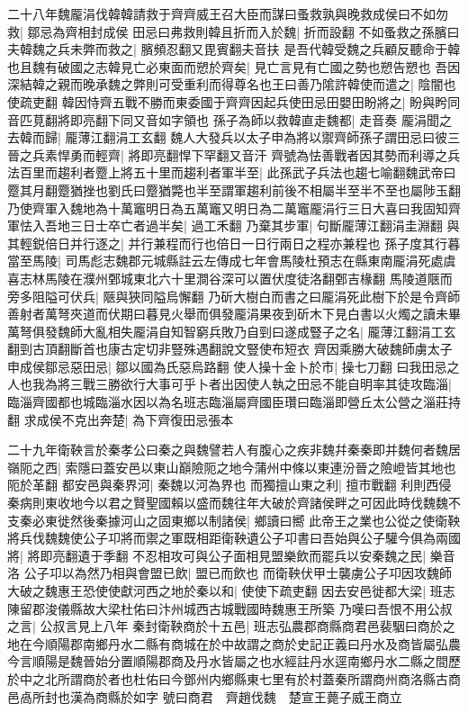 二十八年魏龎涓伐韓韓請救于齊齊威王召大臣而謀曰蚤救孰與晚救成侯曰不如勿救|{
	鄒忌為齊相封成侯}
田忌曰弗救則韓且折而入於魏|{
	折而設翻}
不如蚤救之孫臏曰夫韓魏之兵未弊而救之|{
	臏頻忍翻又毘賓翻夫音扶}
是吾代韓受魏之兵顧反聽命于韓也且魏有破國之志韓見亡必東面而愬於齊矣|{
	見亡言見有亡國之勢也愬告愬也}
吾因深結韓之親而晚承魏之弊則可受重利而得尊名也王曰善乃隂許韓使而遣之|{
	陰闇也使疏吏翻}
韓因恃齊五戰不勝而東委國于齊齊因起兵使田忌田嬰田盼將之|{
	盼與盻同音匹莧翻將即亮翻下同又音如字領也}
孫子為師以救韓直走魏都|{
	走音奏}
龎涓聞之去韓而歸|{
	龎薄江翻涓工玄翻}
魏人大發兵以太子申為將以禦齊師孫子謂田忌曰彼三晉之兵素悍勇而輕齊|{
	將即亮翻悍下罕翻又音汗}
齊號為怯善戰者因其勢而利導之兵法百里而趨利者蹷上將五十里而趨利者軍半至|{
	此孫武子兵法也趨七喻翻魏武帝曰蹷其月翻蹷猶挫也劉氏曰蹷猶斃也半至謂軍趨利前後不相屬半至半不至也屬陟玉翻}
乃使齊軍入魏地為十萬竈明日為五萬竈又明日為二萬竈龎涓行三日大喜曰我固知齊軍怯入吾地三日士卒亡者過半矣|{
	過工禾翻}
乃棄其步軍|{
	句斷龎薄江翻涓圭淵翻}
與其輕鋭倍日并行逐之|{
	并行兼程而行也倍日一日行兩日之程亦兼程也}
孫子度其行暮當至馬陵|{
	司馬彪志魏郡元城縣註云左傳成七年會馬陵杜預志在縣東南龎涓死處虞喜志林馬陵在濮州鄄城東北六十里澗谷深可以置伏度徒洛翻鄄吉椽翻}
馬陵道陿而旁多阻隘可伏兵|{
	陿與狹同隘烏懈翻}
乃斫大樹白而書之曰龎涓死此樹下於是令齊師善射者萬弩夾道而伏期曰暮見火舉而俱發龎涓果夜到斫木下見白書以火燭之讀未畢萬弩俱發魏師大亂相失龎涓自知智窮兵敗乃自剄曰遂成豎子之名|{
	龎薄江翻涓工玄翻剄古頂翻斷首也康古定切非豎殊遇翻說文豎使布短衣}
齊因乘勝大破魏師虜太子申成侯鄒忌惡田忌|{
	鄒以國為氏惡烏路翻}
使人操十金卜於市|{
	操七刀翻}
曰我田忌之人也我為將三戰三勝欲行大事可乎卜者出因使人執之田忌不能自明率其徒攻臨淄|{
	臨淄齊國都也城臨淄水因以為名班志臨淄屬齊國臣瓚曰臨淄即營丘太公營之淄莊持翻}
求成侯不克出奔楚|{
	為下齊復田忌張本}


二十九年衛鞅言於秦孝公曰秦之與魏譬若人有腹心之疾非魏幷秦秦即并魏何者魏居嶺阨之西|{
	索隱曰蓋安邑以東山巔險阨之地今蒲州中條以東連汾晉之險嶝皆其地也阨於革翻}
都安邑與秦界河|{
	秦魏以河為界也}
而獨擅山東之利|{
	擅市戰翻}
利則西侵秦病則東收地今以君之賢聖國賴以盛而魏往年大破於齊諸侯畔之可因此時伐魏魏不支秦必東徙然後秦據河山之固東鄉以制諸侯|{
	鄉讀曰嚮}
此帝王之業也公從之使衛鞅將兵伐魏魏使公子卭將而禦之軍既相距衛鞅遺公子卭書曰吾始與公子驩今俱為兩國將|{
	將即亮翻遺于季翻}
不忍相攻可與公子面相見盟樂飲而罷兵以安秦魏之民|{
	樂音洛}
公子卭以為然乃相與會盟已飲|{
	盟已而飲也}
而衛鞅伏甲士襲虜公子卭因攻魏師大破之魏惠王恐使使獻河西之地於秦以和|{
	使使下疏吏翻}
因去安邑徙都大梁|{
	班志陳留郡浚儀縣故大梁杜佑曰汴州城西古城戰國時魏惠王所築}
乃嘆曰吾恨不用公叔之言|{
	公叔言見上八年}
秦封衛鞅商於十五邑|{
	班志弘農郡商縣商君邑裴駰曰商於之地在今順陽郡南鄉丹水二縣有商城在於中故謂之商於史記正義曰丹水及商皆屬弘農今言順陽是魏晉始分置順陽郡商及丹水皆屬之也水經註丹水逕南鄉丹水二縣之間歷於中之北所謂商於者也杜佑曰今鄧州内鄉縣東七里有於村蓋秦所謂商州商洛縣古商邑卨所封也漢為商縣於如字}
號曰商君　齊趙伐魏　楚宣王薨子威王商立


